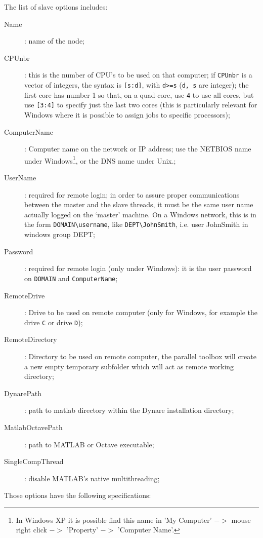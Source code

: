 \documentclass[12pt,a4paper,pdftex]{article}
\begin{document}
The list of slave options includes:
\begin{description}
\item[Name]: name of the node;
\item[CPUnbr]:  this is the number of CPU's to be used on that computer; if \verb"CPUnbr" is a vector of integers, the syntax is \verb"[s:d]", with \verb"d>=s" (\verb"d, s" are integer); the first core has number 1 so that, on a quad-core, use \verb"4" to use all cores, but use \verb"[3:4]" to specify just the last two cores (this is particularly relevant for Windows where it is possible to assign jobs to specific processors);
\item[ComputerName]: Computer name on the network or IP address; use the NETBIOS name under Windows\footnote{In Windows XP it is possible find this name in 'My Computer' $->$ mouse right click $->$ 'Property' $->$ 'Computer Name'.}, or the DNS name under Unix.;
\item[UserName]: required for remote login; in order to assure proper communications between the master and the slave threads, it must be the same user name actually logged on the `master' machine. On a Windows network, this is in the form \verb"DOMAIN\username", like \verb"DEPT\JohnSmith", i.e. user JohnSmith in windows group DEPT;
\item[Password]: required for remote login (only under Windows): it is the user password on \verb"DOMAIN" and \verb"ComputerName";
\item[RemoteDrive]: Drive to be used on remote computer (only for Windows, for example the drive \verb"C" or drive \verb"D");
\item[RemoteDirectory]: Directory to be used on remote computer, the parallel toolbox will create a new empty temporary subfolder which will act as remote working directory;
\item[DynarePath]: path to matlab directory within the Dynare installation directory;
\item[MatlabOctavePath]: path to MATLAB or Octave executable;
\item[SingleCompThread]: disable MATLAB's native multithreading;
\end{description}

Those options have the following specifications:
\end{document}
